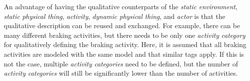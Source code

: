 An advantage of having the qualitative counterparts of the \textit{static environment}, \cstartb \textit{static physical thing}\cendb, \textit{activity}, \cstartb \textit{dynamic physical thing}, \cendb and \textit{actor} is that the qualitative description can be reused and exchanged. For example, there can be many different braking activities, but there needs to be only one \textit{activity category} for qualitatively defining the braking activity. Here, it is assumed that all braking activities are modeled with the same model and that similar tags apply. If this is not the case, multiple \textit{activity categories} need to be defined, but the number of \textit{activity categories} will still be significantly lower than the number of activities.

